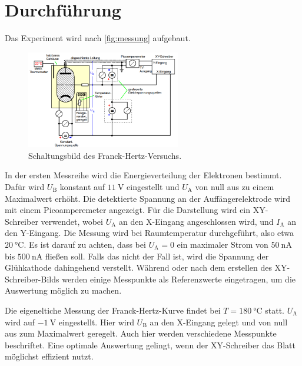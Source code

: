 \section{Durchführung}
\label{sec:Durchführung}


Das Experiment wird nach \autoref{fig:messung} aufgebaut.

\begin{figure}
    \centering
    \includegraphics[width=0.6\textwidth]{images/bild5.png}
    \caption{Schaltungsbild des Franck-Hertz-Versuchs.\cite{V601}}
    \label{fig:messung}
\end{figure}

In der ersten Messreihe wird die Energieverteilung der Elektronen bestimmt.
Dafür wird $U_\text{B}$ konstant auf $\SI{11}{\volt}$ eingestellt und $U_\text{A}$ von null aus zu einem Maximalwert erhöht.
Die detektierte Spannung an der Auffängerelektrode wird mit einem Picoamperemeter angezeigt.
Für die Darstellung wird ein XY-Schreiber verwendet, wobei $U_\text{A}$ an den X-Eingang angeschlossen wird, und $I_\text{A}$ an den Y-Eingang.
Die Messung wird bei Raumtemperatur durchgeführt, also etwa $\SI{20}{\celsius}$.
Es ist darauf zu achten, dass bei $U_\text{A} = 0$ ein maximaler Strom von $\SI{50}{\nano\ampere}$ bis $\SI{500}{\nano\ampere}$ fließen soll. 
Falls das nicht der Fall ist, wird die Spannung der Glühkathode dahingehend verstellt.
Während oder nach dem erstellen des XY-Schreiber-Bilds werden einige Messpunkte als Referenzwerte eingetragen, um die Auswertung möglich zu machen.

Die eigeneltiche Messung der Franck-Hertz-Kurve findet bei $T = \SI{180}{\celsius}$ statt.
$U_\text{A}$ wird auf $\SI{-1}{\volt}$ eingestellt.
Hier wird $U_\text{B}$ an den X-Eingang gelegt und von null aus zum Maximalwert geregelt.
Auch hier werden verschiedene Messpunkte beschriftet.
Eine optimale Auswertung gelingt, wenn der XY-Schreiber das Blatt möglichst effizient nutzt.
